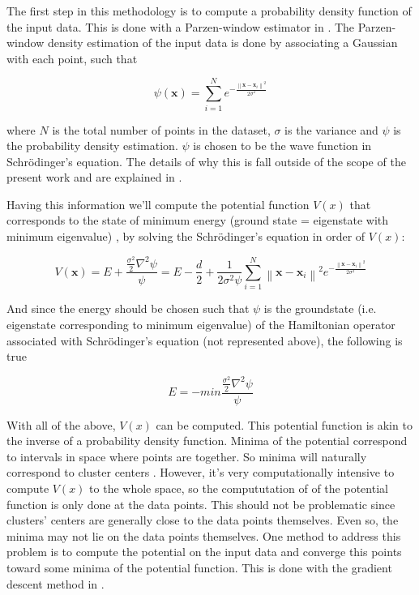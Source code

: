 The first step in this methodology is to compute a probability density function of the input data.
This is done with a Parzen-window estimator in \cite{Horn2001a,Weinstein2009}.
The Parzen-window density estimation of the input data is done by associating a Gaussian with each point, such that

$$ \psi (\mathbf{x}) = \sum ^N _{i=1} e^{- \frac{\left \| \mathbf{x}-\mathbf{x}_i \right \| ^2}{2 \sigma ^2}} $$

where $N$ is the total number of points in the dataset, $\sigma$ is the variance and $\psi$ is the probability density estimation. $\psi$ is chosen to be the wave function in Schrödinger's equation.
The details of why this is fall outside of the scope of the present work and are explained in \cite{Weinstein2009,Horn2001a,Horn2001b}.

Having this information we'll compute the potential function $V(x)$ that corresponds to the state of minimum energy (ground state = eigenstate with minimum eigenvalue) \cite{Horn2001a}, by solving the Schrödinger's equation in order of $V(x)$:      

$$
V(\mathbf{x}) = E + \frac {\frac{\sigma^2}{2}\nabla^2 \psi }{\psi} 
= E - \frac{d}{2} + \frac {1}{2 \sigma^2 \psi} \sum ^N _{i=1} \left \| \mathbf{x}-\mathbf{x}_i \right \| ^2 e^{- \frac{\left \| \mathbf{x}-\mathbf{x}_i \right \| ^2}{2 \sigma ^2}}
$$

And since the energy should be chosen such that $\psi$ is the groundstate (i.e. eigenstate corresponding to minimum eigenvalue) of the Hamiltonian operator associated with Schrödinger's equation (not represented above), the following is true

$$
E = - min \frac {\frac{\sigma^2}{2}\nabla^2 \psi }{\psi}
$$

With all of the above, $V(x)$ can be computed.
This potential function is akin to the inverse of a probability density function.
Minima of the potential correspond to intervals in space where points are together.
So minima will naturally correspond to cluster centers \cite{Horn2001a}.
However, it's very computationally intensive to compute $V(x)$ to the whole space, so the compututation of of the potential function is only done at the data points.
This should not be problematic since clusters' centers are generally close to the data points themselves. 
Even so, the minima may not lie on the data points themselves.
One method to address this problem is to compute the potential on the input data and converge this points toward some minima of the potential function.
This is done with the gradient descent method in \cite{Horn2001a}. 

